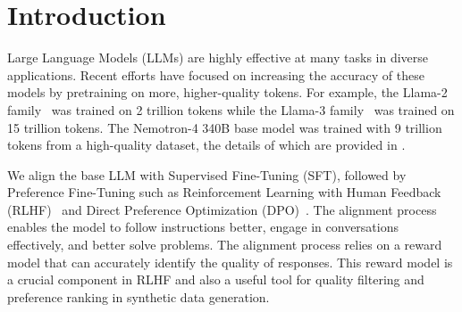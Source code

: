 \documentclass[11pt]{article}
\begin{document}
\section{Introduction}



Large Language Models (LLMs) are highly effective at many tasks in diverse applications.
Recent efforts have focused on increasing the accuracy of these models by pretraining on more, higher-quality tokens. 
For example, the Llama-2 family~\citep{touvron2023llama2} was trained on 2 trillion tokens while the Llama-3 family~\citep{llama3} was trained on 15 trillion tokens.
The Nemotron-4 340B base model was trained with 9 trillion tokens from a high-quality dataset, the details of which are provided in \cite{parmar2024nemotron4}.


We align the base LLM with Supervised Fine-Tuning (SFT), followed by Preference Fine-Tuning such as Reinforcement Learning with Human Feedback (RLHF)~\citep{ouyang2022training, bai2022training} and Direct Preference Optimization (DPO)~\citep{rafailov2024direct}.
The alignment process enables the model to follow instructions better, engage in conversations effectively, and better solve problems. The alignment process relies on a reward model that can accurately identify the quality of responses. This reward model is a crucial component in RLHF and also a useful tool for quality filtering and preference ranking in synthetic data generation.
\end{document}
